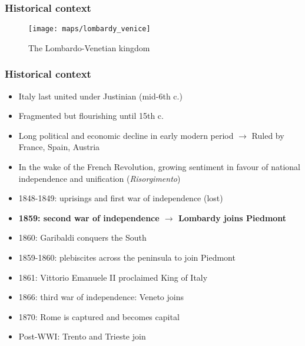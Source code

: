 \documentclass[10pt]{beamer}
\begin{document}
\begin{frame}
    \frametitle{Historical context}
    
    \begin{figure}
        \centering
        \texttt{[image: maps/lombardy\_venice]}
        \caption{The Lombardo-Venetian kingdom}
        \label{fig:map_lombardy_venice}
    \end{figure}
    
\end{frame}

\begin{frame}
    \frametitle{Historical context}
    
    \begin{itemize}
        \item Italy last united under Justinian (mid-6th c.)
        \item Fragmented but flourishing until 15th c.
        \item Long political and economic decline in early modern period $\rightarrow$ Ruled by France, Spain, Austria
        \item In the wake of the French Revolution, growing sentiment in favour of national independence and unification (\textit{Risorgimento})
        \pause
        \item 1848-1849: uprisings and first war of independence (lost)
        \item \textbf{1859: second war of independence $\rightarrow$ Lombardy joins Piedmont}
        \item 1860: Garibaldi conquers the South
        \item 1859-1860: plebiscites across the peninsula to join Piedmont
        \item 1861: Vittorio Emanuele II proclaimed King of Italy
        \item 1866: third war of independence: Veneto joins
        \item 1870: Rome is captured and becomes capital
        \item Post-WWI: Trento and Trieste join
    \end{itemize}
    
\end{frame}
\end{document}

